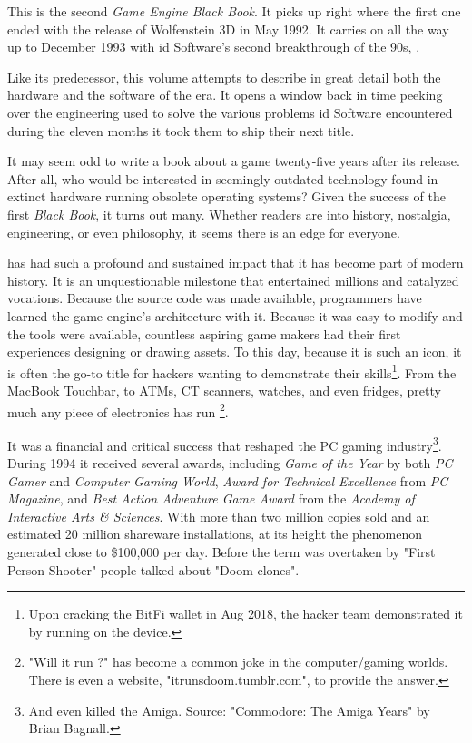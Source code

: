 This is the second \textit{Game Engine Black Book}. It picks up right where the first one ended with the release of Wolfenstein 3D in May 1992. It carries on all the way up to December 1993 with id Software's second breakthrough of the 90s, \doom{}.\\ %
\par
 Like its predecessor, this volume attempts to describe in great detail both the hardware and the software of the era. It opens a window back in time peeking over the engineering used to solve the various problems id Software encountered during the eleven months it took them to ship their next title.\\%
\par
It may seem odd to write a book about a game twenty-five years after its release. After all, who would be interested in seemingly outdated technology found in extinct hardware running obsolete operating systems? Given the success of the first \textit{Black Book}, it turns out many. Whether readers are into history, nostalgia, engineering, or even philosophy, it seems there is an edge for everyone.\\ 

\par
\doom{} has had such a profound and sustained impact that it has become part of modern history. It is an unquestionable milestone that entertained millions and catalyzed vocations. Because the source code was made available, programmers have learned the game engine's architecture with it. Because it was easy to modify and the tools were available, countless aspiring game makers had their first experiences designing or drawing assets. To this day, because it is such an icon, it is often the go-to title for hackers wanting to demonstrate their skills\footnote{Upon cracking the BitFi wallet in Aug 2018, the hacker team demonstrated it by running \doom{} on the device.}. From the MacBook Touchbar, to ATMs, CT scanners, watches, and even fridges, pretty much any piece of electronics has run \doom{} \footnote{ "Will it run \doom{}?" has become a common joke in the computer/gaming worlds. There is even a website, "itrunsdoom.tumblr.com", to provide the answer.}.\\
\par

It was a financial and critical success that reshaped the PC gaming industry\footnote{And even killed the Amiga. Source: "Commodore: The Amiga Years" by Brian Bagnall.}. During 1994 it received several awards, including \textit{Game of the Year} by both \textit{PC Gamer} and \textit{Computer Gaming World}, \textit{Award for Technical Excellence} from \textit{PC Magazine}, and \textit{Best Action Adventure Game Award} from the \textit{Academy of Interactive Arts \& Sciences}. With more than two million copies sold and an estimated 20 million shareware installations, at its height the phenomenon generated close to \$100,000 per day. Before the term was overtaken by "First Person Shooter" people talked about "Doom clones".\\
\par

